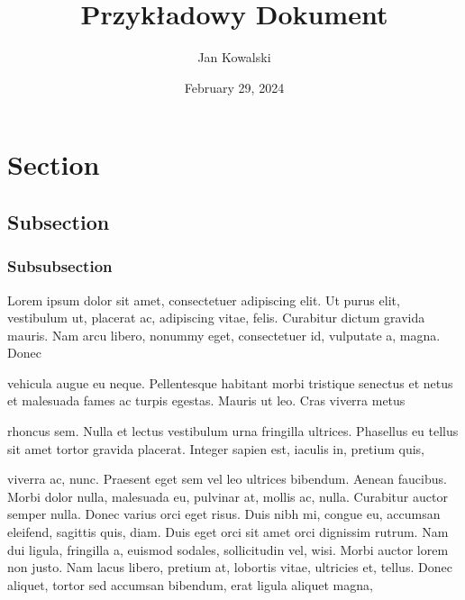 \documentclass{article}
\title{Przykładowy Dokument}
\author{Jan Kowalski }
\date{February 29, 2024}
\begin{document}
\maketitle

\begin{figure}[b]
\tableofcontents
\end{figure}
\clearpage

\section{Section}
\subsection{Subsection}
\subsubsection{Subsubsection}
Lorem ipsum dolor sit amet, consectetuer adipiscing elit. Ut purus elit, vestibulum ut, placerat ac, adipiscing vitae, felis. Curabitur dictum gravida mauris.
Nam arcu libero, nonummy eget, consectetuer id, vulputate a, magna. Donec

vehicula augue eu neque. Pellentesque habitant morbi tristique senectus et netus et malesuada fames ac turpis egestas. Mauris ut leo. Cras viverra metus

rhoncus sem. Nulla et lectus vestibulum urna fringilla ultrices. Phasellus eu tellus sit amet tortor gravida placerat. Integer sapien est, iaculis in, pretium quis,

viverra ac, nunc. Praesent eget sem vel leo ultrices bibendum. Aenean faucibus.
Morbi dolor nulla, malesuada eu, pulvinar at, mollis ac, nulla. Curabitur auctor
semper nulla. Donec varius orci eget risus. Duis nibh mi, congue eu, accumsan
eleifend, sagittis quis, diam. Duis eget orci sit amet orci dignissim rutrum.
Nam dui ligula, fringilla a, euismod sodales, sollicitudin vel, wisi. Morbi
auctor lorem non justo. Nam lacus libero, pretium at, lobortis vitae, ultricies et,
tellus. Donec aliquet, tortor sed accumsan bibendum, erat ligula aliquet magna,
\end{document}
